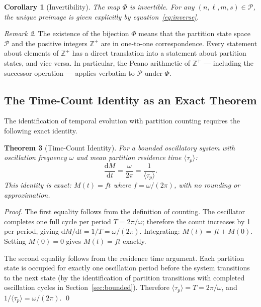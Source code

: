 \documentclass[twocolumn,10pt,a4paper]{article}
\theoremstyle{thmstyle}
\newtheorem{theorem}{Theorem}[section]
\newtheorem{corollary}[theorem]{Corollary}
\theoremstyle{definition}
\theoremstyle{remark}
\newtheorem{remark}[theorem]{Remark}
\newcommand{\Zp}{\mathbb{Z}^{+}}
\newcommand{\Parts}{\mathcal{P}}
\newcommand{\tp}{\langle\tau_{p}\rangle}
\newcommand{\dM}{\mathrm{d}M}
\newcommand{\dt}{\mathrm{d}t}
\newcommand{\PhiMap}{\varPhi}
\begin{document}
\begin{corollary}[Invertibility]
\label{cor:inverse}
The map $\PhiMap$ is invertible. For any $(n, \ell, m, s) \in \Parts$, the unique preimage is given explicitly by equation~\eqref{eq:inverse}.
\end{corollary}

\begin{remark}
The existence of the bijection $\PhiMap$ means that the partition state space $\Parts$ and the positive integers $\Zp$ are in one-to-one correspondence. Every statement about elements of $\Zp$ has a direct translation into a statement about partition states, and vice versa. In particular, the Peano arithmetic of $\Zp$ --- including the successor operation --- applies verbatim to $\Parts$ under $\PhiMap$.
\end{remark}

\subsection{The Time-Count Identity as an Exact Theorem}

The identification of temporal evolution with partition counting requires the following exact identity.

\begin{theorem}[Time-Count Identity]
\label{thm:time-count}
For a bounded oscillatory system with oscillation frequency $\omega$ and mean partition residence time $\tp$:
\begin{equation}
    \frac{\dM}{\dt} = \frac{\omega}{2\pi} = \frac{1}{\tp}.
    \label{eq:time-count}
\end{equation}
This identity is exact: $M(t) = ft$ where $f = \omega/(2\pi)$, with no rounding or approximation.
\end{theorem}

\begin{proof}
The first equality follows from the definition of counting. The oscillator completes one full cycle per period $T = 2\pi/\omega$; therefore the count increases by 1 per period, giving $\dM/\dt = 1/T = \omega/(2\pi)$. Integrating: $M(t) = ft + M(0)$. Setting $M(0) = 0$ gives $M(t) = ft$ exactly.

The second equality follows from the residence time argument. Each partition state is occupied for exactly one oscillation period before the system transitions to the next state (by the identification of partition transitions with completed oscillation cycles in Section~\ref{sec:bounded}). Therefore $\tp = T = 2\pi/\omega$, and $1/\tp = \omega/(2\pi)$. \qed
\end{proof}
\end{document}
